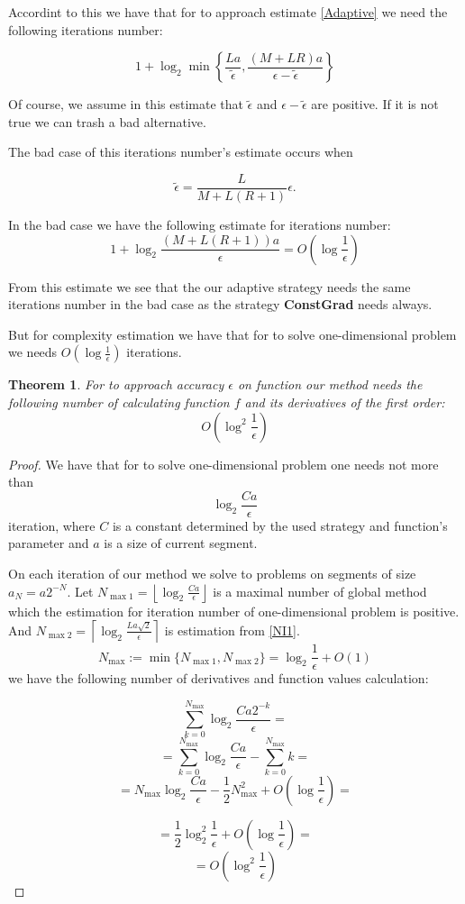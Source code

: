 \documentclass[12pt]{article}
\newtheorem{theorem}{Theorem}[section]
\begin{document}
Accordint to this we have that for to approach estimate \ref{Adaptive} we need the following iterations number:

$$1+\log_2\min\left\{\frac{La}{\tilde{\epsilon}},\frac{(M+LR)a}{\epsilon-\tilde{\epsilon}}\right\}$$

Of course, we assume in this estimate that $\tilde{\epsilon}$ and $\epsilon-\tilde{\epsilon}$ are positive. If it is not true we can trash a bad alternative.

The bad case of this iterations number's estimate occurs when

$$\tilde{\epsilon} = \frac{L}{M+L(R+1)}\epsilon.$$

In the bad case we have the following estimate for iterations number:
$$1+\log_2\frac{(M+L(R+1))a}{\epsilon} = O\left(\log\frac{1}{\epsilon}\right)$$

From this estimate we see that the our adaptive strategy needs the same iterations number in the bad case as the strategy \textbf{ConstGrad} needs always.

But for complexity estimation we have that for to solve one-dimensional problem we needs $O\left(\log \frac{1}{\epsilon}\right)$ iterations.

\begin{theorem}
For to approach accuracy $\epsilon$ on function our method needs the following number of calculating function $f$ and its derivatives of the first order:
$$O\left(\log^2\frac{1}{\epsilon}\right)$$
\end{theorem} 
\begin{proof}
We have that for to solve one-dimensional problem one needs not more than
$$\log_2\frac{Ca}{\epsilon}$$
iteration, where $C$ is a constant determined by the used strategy and function's parameter and $a$ is a size of current segment.

On each iteration of our method we solve to problems on segments of size $a_N=a2^{-N}$. Let $N_{\max1}=\left\lfloor\log_2\frac{Ca}{\epsilon}\right\rfloor$ is a maximal number of global method which the estimation for iteration number of one-dimensional problem is positive. And $N_{\max2}=\left\lceil\log_2\frac{La\sqrt{2}}{\epsilon}\right\rceil$ is estimation from \ref{NI1}. $$N_{\max}:=\min\{N_{\max1},N_{\max2}\}=\log_2\frac{1}{\epsilon}+O(1)$$ we have the following number of derivatives and function values calculation:

$$\sum_{k=0}^{N_{\max}}\log_2\frac{Ca2^{-k}}{\epsilon} = $$
$$= \sum_{k=0}^{N_{\max}}\log_2\frac{Ca}{\epsilon} - \sum_{k=0}^{N_{\max}}k=$$
$$= N_{\max}\log_2\frac{Ca}{\epsilon} - \frac{1}{2}N_{\max}^2 + O\left(\log\frac{1}{\epsilon}\right)=$$

$$= \frac{1}{2}\log_2^2\frac{1}{\epsilon} +O\left(\log\frac{1}{\epsilon}\right)=$$
$$=O\left(\log^2\frac{1}{\epsilon}\right)$$
\end{proof}
\end{document}
